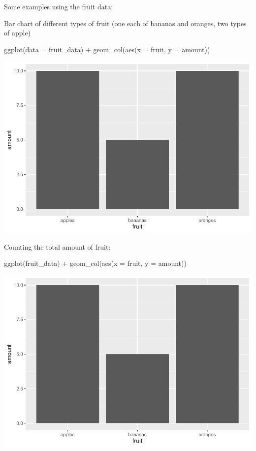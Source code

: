 \documentclass[
]{book}
\newenvironment{Shaded}{\begin{snugshade}}{\end{snugshade}}
\newcommand{\AttributeTok}[1]{\textcolor[rgb]{0.77,0.63,0.00}{#1}}
\newcommand{\FunctionTok}[1]{\textcolor[rgb]{0.00,0.00,0.00}{#1}}
\newcommand{\NormalTok}[1]{#1}
\newcommand{\SpecialCharTok}[1]{\textcolor[rgb]{0.00,0.00,0.00}{#1}}
\begin{document}
Some examples using the fruit data:

Bar chart of different types of fruit (one each of bananas and oranges, two types of apple)

\begin{Shaded}
\begin{Highlighting}[]
\FunctionTok{ggplot}\NormalTok{(}\AttributeTok{data =}\NormalTok{ fruit\_data) }\SpecialCharTok{+} \FunctionTok{geom\_col}\NormalTok{(}\FunctionTok{aes}\NormalTok{(}\AttributeTok{x =}\NormalTok{ fruit, }\AttributeTok{y =}\NormalTok{ amount))}
\end{Highlighting}
\end{Shaded}

\includegraphics{_main_files/figure-latex/unnamed-chunk-24-1.pdf}

Counting the total amount of fruit:

\begin{Shaded}
\begin{Highlighting}[]
\FunctionTok{ggplot}\NormalTok{(fruit\_data) }\SpecialCharTok{+} \FunctionTok{geom\_col}\NormalTok{(}\FunctionTok{aes}\NormalTok{(}\AttributeTok{x =}\NormalTok{ fruit, }\AttributeTok{y =}\NormalTok{ amount))}
\end{Highlighting}
\end{Shaded}

\includegraphics{_main_files/figure-latex/unnamed-chunk-25-1.pdf}
\end{document}

